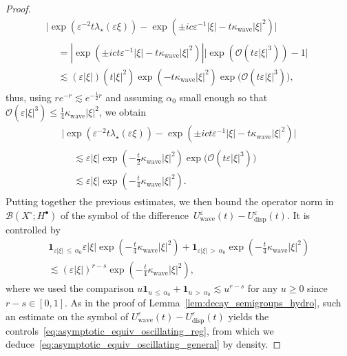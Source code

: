 \documentclass[10pt]{amsart}
\theoremstyle{definition}\newtheorem{defi}[theo]{Definition}\newtheorem{rema}[theo]{Remark}\newtheorem{exam}[theo]{Example}\newtheorem{exem}[theo]{Example}\newtheorem{nota}[theo]{Notation}
\newcommand{\Wave}{\mathrm{wave}}
\newcommand{\disp}{\mathrm{disp}}
\newcommand{\Burin}{\mathbf{1}}
\newcommand{\OO}{\mathcal{O}}
\newcommand{\BBB}{\mathscr{B}}
\newcommand{\Ssp}{H^{\bullet}}
\newcommand{\Slm}{X^{\circ}}
\renewcommand*\le{\leqslant}
\renewcommand*\geq{\geqslant}
\newcommand*\eps{{\varepsilon}}
\begin{document}
\begin{proof}
\begin{multline*}
\Big| \exp\left(\eps^{-2} t \lambda_{\star}(\eps \xi) \right)  - \exp\left(\pm i c \eps^{-1} |\xi| - t \kappa_\Wave | \xi |^2 \right) \Big| \\
\begin{aligned}
& = \left| \exp\left(\pm i c t \eps^{-1}|\xi| - t \kappa_\Wave | \xi |^2 \right) \right| \Big| \exp \left(\OO\left(t \eps | \xi |^3 \right) \right) -1 \Big|
\\
& \lesssim \left(\eps | \xi|\right) \left(t | \xi |^2\right) \exp\left(- t \kappa_\Wave | \xi |^2 \right) \exp\Big(\OO\left(t \eps | \xi |^3 \right) \Big),
\end{aligned}
\end{multline*}
thus, using $re^{-r} \lesssim e^{-\frac{1}{2}r}$ and assuming $\alpha_{0}$ small enough so that $\OO(\eps | \xi |^3) \le \frac{1}{4}\kappa_\Wave | \xi |^2$, we obtain
\begin{multline*}
\Big| \exp\left(\eps^{-2} t \lambda_{\star}(\eps \xi) \right)  - \exp\left(\pm i c t \eps^{-1}|\xi| - t \kappa_\Wave | \xi |^2 \right) \Big|\\
\begin{aligned}
& \lesssim \eps | \xi | \exp\left(- \frac{t}{2} \kappa_\Wave | \xi |^2 \right) \exp\Big(\OO\left(t \eps | \xi |^3 \right) \Big) \\
& \lesssim \eps | \xi | \exp\left(- \frac{t}{4} \kappa_\Wave | \xi |^2 \right).
\end{aligned}
\end{multline*}
Putting together the previous estimates, we then bound the operator norm in $\BBB(\Slm ;\Ssp)$ of the symbol of the difference~$U^\eps_\Wave(t) - U^\eps_\disp(t)$. It is controlled by
\begin{multline*}
\Burin _{\eps | \xi |\,\le\,\alpha_0} \eps | \xi | \exp\left(- \frac{t}{4} \kappa_\Wave | \xi |^2 \right)  + \Burin _{\eps | \xi |\,>\,\alpha_0} \exp\left(- \frac{t}{4} \kappa_\Wave | \xi |^2 \right) \\
 \lesssim \left(\eps | \xi |\right)^{r - s} \exp\left(- \frac{t}{4} \kappa_\Wave | \xi |^2 \right),
\end{multline*}
where we used the comparison $u\Burin_{u\,\le\,\alpha_{0}} + \Burin_{u\,>\,\alpha_{0}} \lesssim u^{r-s}$ for any $u \geq0$ since $r-s \in [0, 1]$. As in the proof of Lemma~\ref{lem:decay_semigroups_hydro}, such an estimate on the symbol of $U^\eps_\Wave(t) - U^\eps_\disp(t)$ yields the controls~\eqref{eq:asymptotic_equiv_oscillating_reg}, from which we deduce~\eqref{eq:asymptotic_equiv_oscillating_general} by density.
\end{proof}
\end{document}
